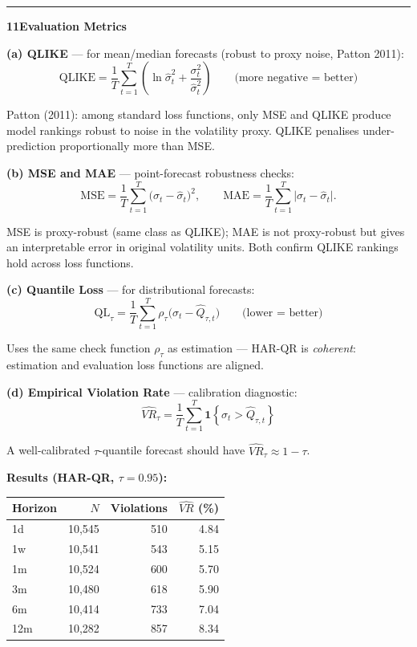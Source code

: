 \documentclass[10pt,a4paper]{article}
\newcommand{\sectionrule}{\vspace{0.3em}\hrule\vspace{0.5em}}
\begin{document}
\sectionrule

\textbf{11\quad Evaluation Metrics}

\textbf{(a) QLIKE} --- for mean/median forecasts (robust to proxy noise,
Patton 2011):
\begin{equation*}
\text{QLIKE} = \frac{1}{T}\sum_{t=1}^{T}\!\left(
\ln\hat{\sigma}_t^2 + \frac{\sigma_t^2}{\hat{\sigma}_t^2}\right)
\qquad\text{(more negative = better)}
\end{equation*}

Patton (2011): among standard loss functions, only MSE and QLIKE produce
model rankings robust to noise in the volatility proxy. QLIKE penalises
under-prediction proportionally more than MSE.

\medskip
\textbf{(b) MSE and MAE} --- point-forecast robustness checks:
\begin{equation*}
\text{MSE} = \frac{1}{T}\sum_{t=1}^{T}\bigl(\sigma_t - \hat{\sigma}_t\bigr)^2,
\qquad
\text{MAE} = \frac{1}{T}\sum_{t=1}^{T}\bigl|\sigma_t - \hat{\sigma}_t\bigr|.
\end{equation*}

MSE is proxy-robust (same class as QLIKE); MAE is not proxy-robust but
gives an interpretable error in original volatility units. Both confirm
QLIKE rankings hold across loss functions.

\medskip
\textbf{(c) Quantile Loss} --- for distributional forecasts:
\begin{equation*}
\text{QL}_\tau = \frac{1}{T}\sum_{t=1}^{T}\rho_\tau\!\bigl(\sigma_t - \hat{Q}_{\tau,t}\bigr)
\qquad\text{(lower = better)}
\end{equation*}

Uses the same check function $\rho_\tau$ as estimation --- HAR-QR is
\emph{coherent}: estimation and evaluation loss functions are aligned.

\medskip
\textbf{(d) Empirical Violation Rate} --- calibration diagnostic:
\begin{equation*}
\widehat{VR}_{\tau} = \frac{1}{T}\sum_{t=1}^{T}\mathbf{1}\!\left\{\sigma_t > \hat{Q}_{\tau,t}\right\}
\end{equation*}

A well-calibrated $\tau$-quantile forecast should have
$\widehat{VR}_\tau \approx 1 - \tau$.

\textbf{Results (HAR-QR, $\tau = 0.95$):}
\begin{center}
\begin{tabular}{lrrr}
\toprule
Horizon & $N$ & Violations & $\widehat{VR}$ (\%) \\
\midrule
1d  & 10,545 & 510 & 4.84 \\
1w  & 10,541 & 543 & 5.15 \\
1m  & 10,524 & 600 & 5.70 \\
3m  & 10,480 & 618 & 5.90 \\
6m  & 10,414 & 733 & 7.04 \\
12m & 10,282 & 857 & 8.34 \\
\bottomrule
\end{tabular}
\end{center}
\end{document}
